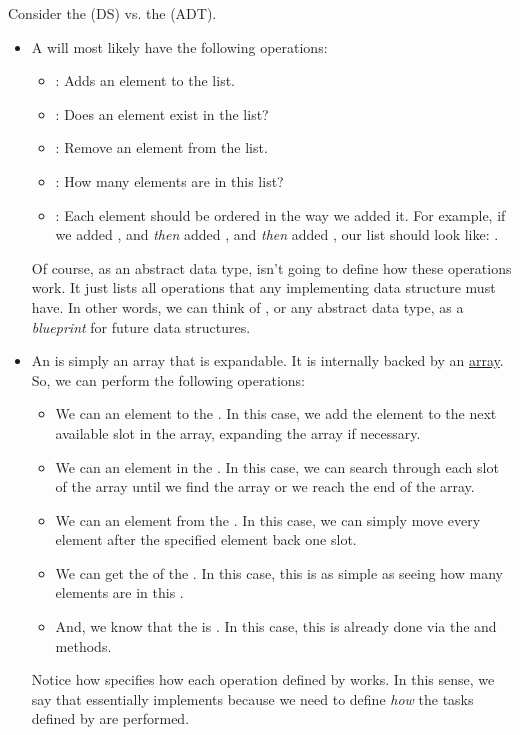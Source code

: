 \documentclass[letterpaper]{article}
\begin{document}
Consider the  (DS) vs. the  (ADT).
\begin{itemize}
    \item A  will most likely have the following operations: 
    \begin{itemize}
        \item {}: Adds an element to the list.
        \item {}: Does an element exist in the list? 
        \item {}: Remove an element from the list. 
        \item {}: How many elements are in this list? 
        \item {}: Each element should be ordered in the way we added it. For example, if we added , and \emph{then} added , and \emph{then} added , our list should look like: \code{[5, 3, 10]}.   
    \end{itemize}

    Of course, as an abstract data type,  isn't going to define how these operations work. It just lists all operations that any implementing data structure must have. In other words, we can think of , or any abstract data type, as a \emph{blueprint} for future data structures. 

    \item An  is simply an array that is expandable. It is internally backed by an \underline{array}. So, we can perform the following operations: 
    \begin{itemize}
        \item We can  an element to the . In this case, we add the element to the next available slot in the array, expanding the array if necessary. 
        \item We can  an element in the . In this case, we can search through each slot of the array until we find the array or we reach the end of the array.
        \item We can  an element from the . In this case, we can simply move every element after the specified element back one slot. 
        \item We can get the  of the . In this case, this is as simple as seeing how many elements are in this .
        \item And, we know that the  is . In this case, this is already done via the  and  methods.  
    \end{itemize}
    Notice how  specifies how each operation defined by  works. In this sense, we say that  essentially implements  because we need to define \emph{how} the tasks defined by  are performed. 
\end{itemize}
\end{document}
